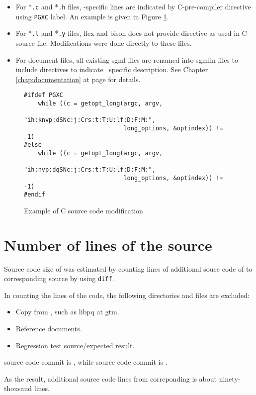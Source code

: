   \begin{itemize}
	  \item For *{\tt.c} and *{\tt.h} files, \XC-specific lines are indicated by C-pre-compiler
	  		directive using {\tt PGXC} label.  An example is given in Figure \ref{fig:PGXCDirective}.
	  \item For *{\tt.l} and *{\tt.y} files, flex and bison does not provide directive as used in C
	  		source file.  Modifications were done directly to these files.
	  \item For document files, all existing sgml files are renamed into sgmlin files to include
	  		directives to indicate \XC~specific description.
	  		See Chapter \ref{chap:documentation} at page \pageref{chap:documentation}for details.
  \end{itemize}
  
  \begin{figure}
	  \begin{lstlisting}[frame=single]
#ifdef PGXC
    while ((c = getopt_long(argc, argv,
					        "ih:knvp:dSNc:j:Crs:t:T:U:lf:D:F:M:",
							long_options, &optindex)) != -1)
#else
    while ((c = getopt_long(argc, argv,
					        "ih:nvp:dqSNc:j:Crs:t:T:U:lf:D:F:M:",
							long_options, &optindex)) != -1)
#endif
	  \end{lstlisting}
	  \begin{center}
		  \caption{\label{fig:PGXCDirective}Example of C source code modification}
	  \end{center}
  \end{figure}
  

\section{\label{sec:numOfLines}Number of lines of the source}

    Source code size of \XC{} was estimated by counting lines of additional souce code of
    \XC{} to corresponding \PG{} source by using \texttt{diff}.
  
    In counting the lines of the code, the following directories and files are excluded:

    \begin{itemize}
  		\item Copy from \PG{}, such as libpq at gtm.
		\item Reference documents.
		\item Regression test source/expected result.
	\end{itemize}

	\XC{} source code commit is , while \PG{} source code commit
	is .

	As the result, additional source code lines from correponding \PG{} is about
	ninety-thousand lines.

